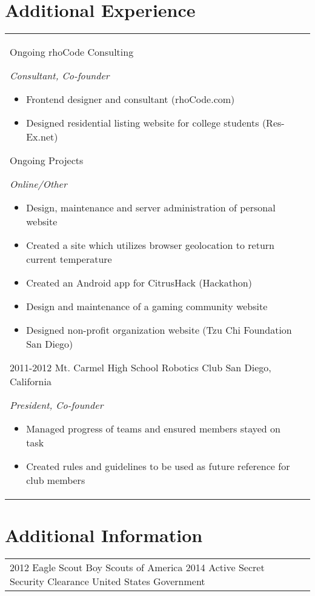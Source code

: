 \documentclass[print]{friggeri-cv} %
\makeatletter
\renewenvironment{entrylist}{%
\par\begin{tabular*}{\textwidth}{@{\extracolsep{\fill}}ll}
}{%
\end{tabular*}\par
}
\makeatother
\begin{document}
\section{Additional Experience}

\begin{entrylist}
\entry
{Ongoing}
{rhoCode Consulting}
{ }
{\emph{Consultant, Co-founder}
\begin{itemize}
\item Frontend designer and consultant (rhoCode.com)
\item Designed residential listing website for college students (Res-Ex.net)
\end{itemize}}
\entry
{Ongoing}
{Projects}
{ }
{\emph{Online/Other}
\begin{itemize}
\item Design, maintenance and server administration of personal website
\item Created a site which utilizes browser geolocation to return current temperature
\item Created an Android app for CitrusHack (Hackathon) 
\item Design and maintenance of a gaming community website
\item Designed non-profit organization website (Tzu Chi Foundation San Diego)
\end{itemize}}
\entry
{2011-2012}
{Mt. Carmel High School Robotics Club}
{San Diego, California}
{\emph{President, Co-founder}
\begin{itemize}
\item Managed progress of teams and ensured members stayed on task
\item Created rules and guidelines to be used as future reference for club members
\end{itemize}}

\end{entrylist}


\section{Additional Information}

\begin{entrylist}
\entry
{2012}
{Eagle Scout}
{Boy Scouts of America}
{}
\entry
{2014}
{Active Secret Security Clearance}
{United States Government}
{}
\end{entrylist}


\end{document}
